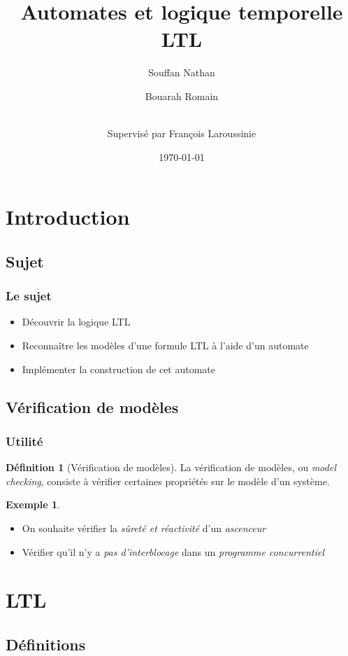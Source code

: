 \documentclass{beamer}
\title {Automates et logique temporelle LTL}
\author{
  Souffan Nathan \and
  Bouarah Romain \and
  \\Supervisé par François Laroussinie
}
\date{\today}
\theoremstyle{plain}
\theoremstyle{definition}
\newtheorem{defi}{Définition}
\newtheorem{ex}{Exemple}
\begin{document}
\begin{frame}[plain]
  \titlepage
\end{frame}


\section{Introduction}
\subsection{Sujet}
\begin{frame}
  \frametitle{Le sujet}

  \begin{itemize}
  \item Découvrir la logique LTL
  \item Reconnaître les modèles d'une formule LTL à l'aide d'un automate
  \item Implémenter la construction de cet automate
  \end{itemize}
\end{frame}


\subsection{Vérification de modèles}
\begin{frame}
  \frametitle{Utilité}

  \begin{defi}[Vérification de modèles]
    La vérification de modèles, ou \textit{model checking}, consiste à vérifier certaines propriétés sur le modèle d'un système.
  \end{defi}
  
  \pause
  
  \begin{ex}
    \begin{itemize}[<+->]
    \item On souhaite vérifier la \textit{sûreté et réactivité} d'un \textit{ascenceur}
    \item Vérifier qu'il n'y a \textit{pas d'interblocage} dans un \textit{programme concurrentiel}
    \end{itemize}
  \end{ex}
\end{frame}


\section{LTL}
\subsection{Définitions}
\end{document}

